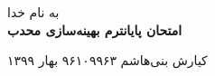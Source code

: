 
\begin{center}
	\vspace*{-2 cm}
به نام خدا\\

\large\textbf{ 
امتحان پایانترم بهینه‌سازی محدب
}
	
	
\end{center}
کیارش بنی‌هاشم \hspace*{0.3 cm}  \small{۹۶۱۰۹۹۶۳} \hfill{بهار ۱۳۹۹}\\
\vspace*{-0.5cm}
\hrulefill
\vspace*{0.5cm}
